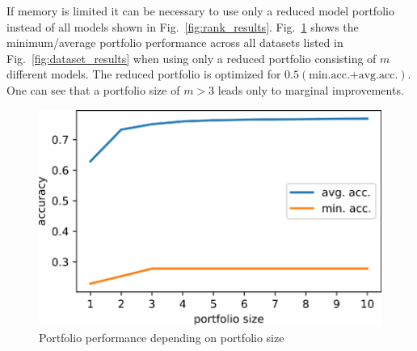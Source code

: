 \documentclass{article}
\begin{document}
If memory is limited it can be necessary to use only a reduced model portfolio instead of all models shown in Fig.~\ref{fig:rank_results}. Fig.~\ref{fig:portfolio_performance} shows the minimum/average portfolio performance across all datasets listed in Fig.~\ref{fig:dataset_results} when using only a reduced portfolio consisting of $m$ different models. The reduced portfolio is optimized for $0.5(\text{min.acc.+avg.acc.})$. One can see that a portfolio size of $m>3$ leads only to marginal improvements.
%
\begin{figure}[htb]
\begin{center}
 	\includegraphics[width=0.7\linewidth]{../figures/portfolio_performance.eps} 
\end{center}
\caption{Portfolio performance depending on portfolio size}
\label{fig:portfolio_performance}
\end{figure} 
%




\end{document}
